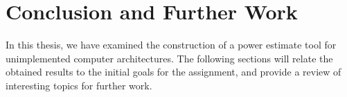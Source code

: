 \chapter{Conclusion and Further Work}

In this thesis, we have examined the construction of a power estimate tool for
unimplemented computer architectures. The following sections will relate the
obtained results to the initial goals for the assignment, and provide a review
of interesting topics for further work.



